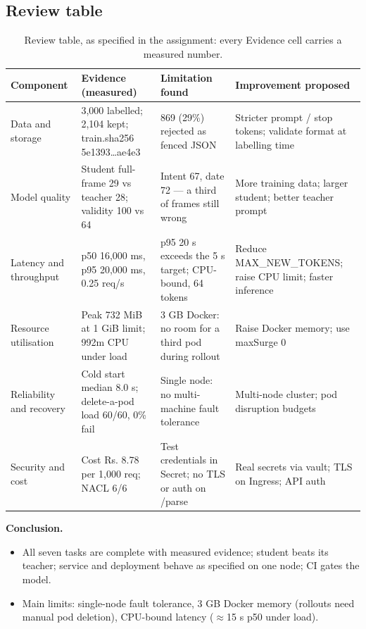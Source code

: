 \documentclass[11pt,a4paper]{article}
\begin{document}
\subsection*{Review table}
\begin{table}[H]\centering\small
\setlength{\tabcolsep}{4pt}\begin{tabular}{p{2.2cm}p{3.4cm}p{4.0cm}p{4.0cm}}
\toprule
Component & Evidence (measured) & Limitation found & Improvement proposed \\
\midrule
Data and storage & 3,000 labelled; 2,104 kept; train.sha256 5e1393\ldots ae4e3 & 869 (29\%) rejected as fenced JSON & Stricter prompt / stop tokens; validate format at labelling time \\
Model quality & Student full-frame 29 vs teacher 28; validity 100 vs 64 & Intent 67, date 72 --- a third of frames still wrong & More training data; larger student; better teacher prompt \\
Latency and throughput & p50 16,000 ms, p95 20,000 ms, 0.25 req/s & p95 20 s exceeds the 5 s target; CPU-bound, 64 tokens & Reduce MAX\_NEW\_TOKENS; raise CPU limit; faster inference \\
Resource utilisation & Peak 732 MiB at 1 GiB limit; 992m CPU under load & 3 GB Docker: no room for a third pod during rollout & Raise Docker memory; use maxSurge 0 \\
Reliability and recovery & Cold start median 8.0 s; delete-a-pod load 60/60, 0\% fail & Single node: no multi-machine fault tolerance & Multi-node cluster; pod disruption budgets \\
Security and cost & Cost Rs. 8.78 per 1,000 req; NACL 6/6 & Test credentials in Secret; no TLS or auth on /parse & Real secrets via vault; TLS on Ingress; API auth \\
\bottomrule
\end{tabular}
\caption{Review table, as specified in the assignment: every Evidence cell carries a measured number.}
\end{table}

\vspace{-0.3cm}
\noindent\textbf{Conclusion.}
\begin{itemize}
\item All seven tasks are complete with measured evidence; student beats its teacher; service and deployment behave as specified on one node; CI gates the model.
\item Main limits: single-node fault tolerance, 3 GB Docker memory (rollouts need manual pod deletion), CPU-bound latency ($\approx$15 s p50 under load).
\end{itemize}
\end{document}
